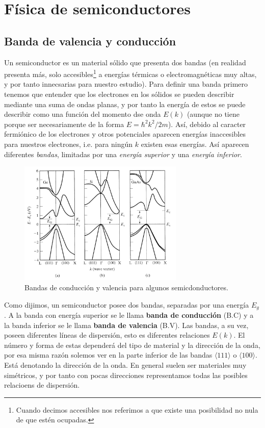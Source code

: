 
\chapter{Física de semiconductores}

\section{Banda de valencia y conducción}

Un semiconductor es un material sólido que presenta dos bandas (en realidad presenta más, solo accesibles\footnote{Cuando decimos accesibles nos referimos a que existe una posibilidad no nula de que estén ocupadas.} a energías térmicas o electromagnéticas muy altas, y por tanto innecsarias para nuestro estudio). Para definir una banda primero tenemos que entender que los electrones en los sólidos se pueden describir mediante una suma de ondas planas, y por tanto la energía de estos se puede describir como una función del momento dse onda $E(k)$ (aunque no tiene porque ser necesariamente de la forma $E=\hbar^2 k^2/2m$). Así, debido al caracter fermiónico de los electrones y otros potenciales aparecen energías inaccesibles para nuestros electrones, i.e. para ningún $k$ existen esas energías. Así aparecen diferentes \textit{bandas}, limitadas por una \textit{energía superior} y una \textit{energía inferior}. 

\begin{figure}[h!] \centering
	\includegraphics[width=0.7\textwidth]{Cuerpo/Ch_01/01_01.png}
	\caption{Bandas de conducción y valencia para algunos semicdonductores.}
\end{figure}

Como dijimos, un semiconductor posee dos bandas, separadas por una energía $E_g$. A la banda con energía superior se le llama \textbf{banda de conducción} (B.C) y a la banda inferior se le llama \textbf{banda de valencia} (B.V). Las bandas, a su vez, poseen diferentes líneas de dispersión, esto es diferentes relaciones $E(k)$. El número y forma de estas dependerá del tipo de material y la dirección de la onda, por esa misma razón solemos ver en la parte inferior de las bandas $\langle 111\rangle $ o $\langle 100\rangle$. Está denotando la dirección de la onda. En general suelen ser materiales muy simétricos, y por tanto con pocas direcciones representamos todas las posibles relacioens de dispersión. 

